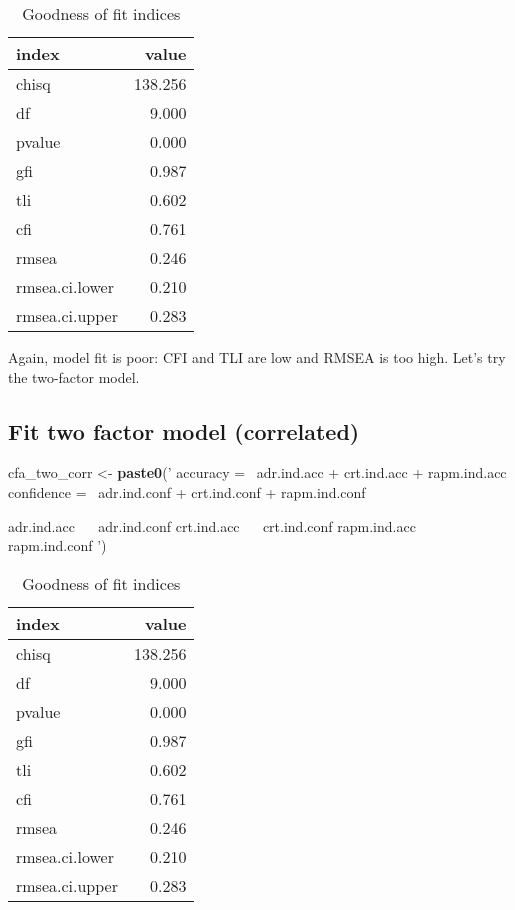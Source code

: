 \documentclass[
]{article}
\newenvironment{Shaded}{\begin{snugshade}}{\end{snugshade}}
\newcommand{\KeywordTok}[1]{\textcolor[rgb]{0.13,0.29,0.53}{\textbf{#1}}}
\newcommand{\NormalTok}[1]{#1}
\newcommand{\StringTok}[1]{\textcolor[rgb]{0.31,0.60,0.02}{#1}}
\begin{document}
\begin{table}[H]

\caption{\label{tab:unnamed-chunk-7}Goodness of fit indices}
\centering
\fontsize{12}{14}\selectfont
\begin{tabular}[t]{lr}
\toprule
index & value\\
\midrule
chisq & 138.256\\
df & 9.000\\
pvalue & 0.000\\
gfi & 0.987\\
tli & 0.602\\
\addlinespace
cfi & 0.761\\
rmsea & 0.246\\
rmsea.ci.lower & 0.210\\
rmsea.ci.upper & 0.283\\
\bottomrule
\end{tabular}
\end{table}

Again, model fit is poor: CFI and TLI are low and RMSEA is too high.
Let's try the two-factor model.

\hypertarget{fit-two-factor-model-correlated}{%
\subsection{Fit two factor model
(correlated)}\label{fit-two-factor-model-correlated}}

\begin{Shaded}
\begin{Highlighting}[]
\NormalTok{cfa_two_corr <-}\StringTok{ }\KeywordTok{paste0}\NormalTok{(}\StringTok{'}
\StringTok{                accuracy  =~ adr.ind.acc + crt.ind.acc + rapm.ind.acc }
\StringTok{                confidence =~ adr.ind.conf + crt.ind.conf + rapm.ind.conf}

\StringTok{                adr.ind.acc ~~ adr.ind.conf}
\StringTok{                crt.ind.acc ~~ crt.ind.conf}
\StringTok{                rapm.ind.acc ~~ rapm.ind.conf}
\StringTok{                     '}\NormalTok{)}
\end{Highlighting}
\end{Shaded}

\begin{table}[H]

\caption{\label{tab:unnamed-chunk-9}Goodness of fit indices}
\centering
\fontsize{12}{14}\selectfont
\begin{tabular}[t]{lr}
\toprule
index & value\\
\midrule
chisq & 138.256\\
df & 9.000\\
pvalue & 0.000\\
gfi & 0.987\\
tli & 0.602\\
\addlinespace
cfi & 0.761\\
rmsea & 0.246\\
rmsea.ci.lower & 0.210\\
rmsea.ci.upper & 0.283\\
\bottomrule
\end{tabular}
\end{table}
\end{document}

